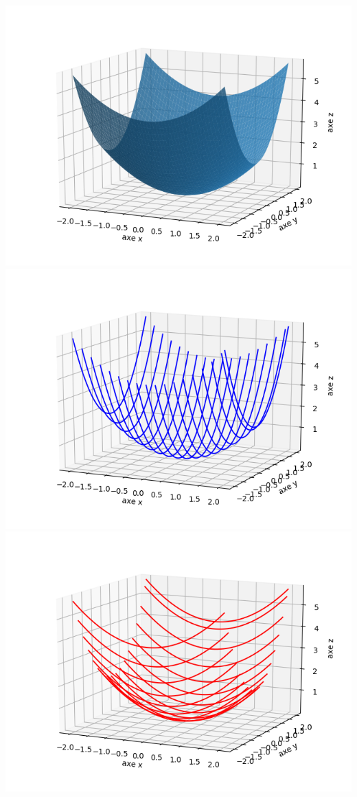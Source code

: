 \documentclass[11pt,class=report,crop=false]{standalone}
\begin{document}
\begin{exemple}
\begin{center}
\includegraphics[scale=\myscale,scale=0.5]{figures/fonctions-quadra-1a}
\includegraphics[scale=\myscale,scale=0.5]{figures/fonctions-quadra-1b}
\includegraphics[scale=\myscale,scale=0.5]{figures/fonctions-quadra-1c}

\end{center}
\end{exemple}
\end{document}

